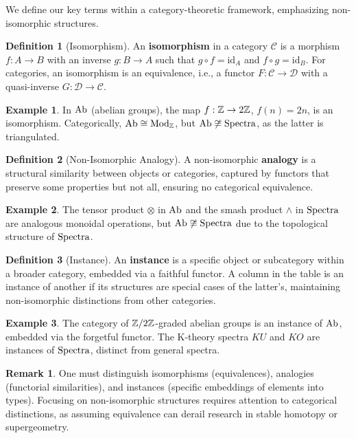 \documentclass{article}
\theoremstyle{plain}
\theoremstyle{definition}
\newtheorem{definition}{Definition}
\newtheorem{example}{Example}
\newtheorem{remark}{Remark}
\begin{document}
We define our key terms within a category-theoretic framework, emphasizing non-isomorphic structures.

\begin{definition}[Isomorphism]
An \textbf{isomorphism} in a category \(\mathcal{C}\) is a morphism \(f: A \to B\) with an inverse \(g: B \to A\) such that \(g \circ f = \text{id}_A\) and \(f \circ g = \text{id}_B\). For categories, an isomorphism is an equivalence, i.e., a functor \(F: \mathcal{C} \to \mathcal{D}\) with a quasi-inverse \(G: \mathcal{D} \to \mathcal{C}\).
\end{definition}

\begin{example}
In \(\text{Ab}\) (abelian groups), the map \(f: \mathbb{Z} \to 2\mathbb{Z}\), \(f(n) = 2n\), is an isomorphism. Categorically, \(\text{Ab} \cong \text{Mod}_{\mathbb{Z}}\), but \(\text{Ab} \not\cong \text{Spectra}\), as the latter is triangulated.
\end{example}

\begin{definition}[Non-Isomorphic Analogy]
A non-isomorphic \textbf{analogy} is a structural similarity between objects or categories, captured by functors that preserve some properties but not all, ensuring no categorical equivalence.
\end{definition}

\begin{example}
The tensor product \(\otimes\) in \(\text{Ab}\) and the smash product \(\wedge\) in \(\text{Spectra}\) are analogous monoidal operations, but \(\text{Ab} \not\cong \text{Spectra}\) due to the topological structure of \(\text{Spectra}\).
\end{example}

\begin{definition}[Instance]
An \textbf{instance} is a specific object or subcategory within a broader category, embedded via a faithful functor. A column in the table is an instance of another if its structures are special cases of the latter’s, maintaining non-isomorphic distinctions from other categories.
\end{definition}

\begin{example}
The category of \(\mathbb{Z}/2\mathbb{Z}\)-graded abelian groups is an instance of \(\text{Ab}\), embedded via the forgetful functor. The K-theory spectra \(KU\) and \(KO\) are instances of \(\text{Spectra}\), distinct from general spectra.
\end{example}

\begin{remark}
One must distinguish isomorphisms (equivalences), analogies (functorial similarities),
and instances (specific embeddings of elements into types). Focusing on non-isomorphic
structures requires attention to categorical distinctions, as assuming equivalence
can derail research in stable homotopy or supergeometry.
\end{remark}
\end{document}

